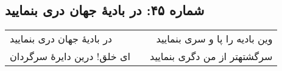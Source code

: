 \begin{center}
\section*{شماره ۴۵: در بادیۀ جهان دری بنمایید}
\label{sec:045}
\begin{longtable}{l p{0.5cm} r}
در بادیهٔ جهان دری بنمایید
&&
وین بادیه را پا و سری بنمایید
\\
ای خلق! درین دایرهٔ سرگردان
&&
سرگشتهتر از من دگری بنمایید
\\
\end{longtable}
\end{center}
